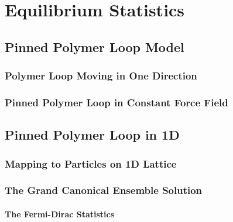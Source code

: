 \chapter{Equilibrium Statistics}

\ifpdf
    \graphicspath{{Chapter4/Figs/Raster/}{Chapter4/Figs/PDF/}{Chapter4/Figs/}}
\else
    \graphicspath{{Chapter4/Figs/Vector/}{Chapter4/Figs/}}
\fi

\section{Pinned Polymer Loop Model}
\label{sec:pinned_polymer_loop_model}

\subsection{Polymer Loop Moving in One Direction}
\label{sub:polymer_loop_moving_in_one_direction}

\subsection{Pinned Polymer Loop in Constant Force Field}
\label{sub:pinned_polymer_loop_in_constant_force_field}




\section{Pinned Polymer Loop in 1D}
\label{sec:pinned_polymer_loop_in_1d}

\subsection{Mapping to Particles on 1D Lattice}
\label{sub:mapping_to_particles_on_1d_lattice}

\subsection{The Grand Canonical Ensemble Solution}
\label{sub:the_grand_canonical_ensemble_solution}

\subsubsection{The Fermi-Dirac Statistics}
\label{ssub:The Fermi-Dirac Statistics}

